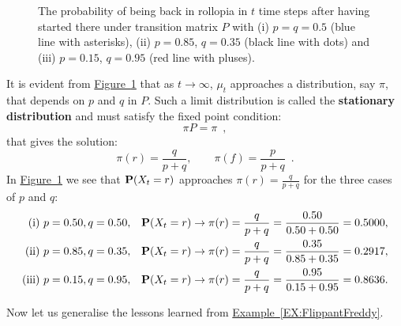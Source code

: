 \begin{example}
\begin{figure}[htpb]
\caption{The probability of being back in rollopia in $t$ time steps after having started there under transition matrix $P$ with (i) $p=q=0.5$ (blue line with asterisks), (ii) $p=0.85$, $q=0.35$ (black line with dots) and (iii) $p=0.15$, $q=0.95$ (red line with pluses).\label{F:FlippantFreddyRollopiaProbs}}
\centering   {}
\end{figure}

It is evident from \hyperref[F:FlippantFreddyRollopiaProbs]{Figure~\ref*{F:FlippantFreddyRollopiaProbs}} that as $t \to \infty$, $\mu_t$ approaches a distribution, say $\pi$, that depends on $p$ and $q$ in $P$.  Such a limit distribution is called the {\bf stationary distribution} and must satisfy the fixed point condition:
\[
\pi P = \pi \enspace ,
\]
that gives the solution:
\[
\pi(r) = \frac{q}{p+q}, \qquad \pi(f) = \frac{p}{p+q} \enspace .
\]
In \hyperref[F:FlippantFreddyRollopiaProbs]{Figure~\ref*{F:FlippantFreddyRollopiaProbs}} we see that $\mathbf{P}(X_t=r)$ approaches $\pi(r) = \frac{q}{p+q}$ for the three cases of $p$ and $q$:
\begin{align*}
\text{(i)}& \ p=0.50, q=0.50, & \mathbf{P}(X_t=r) & \to \pi(r) = \frac{q}{p+q} =  \frac{0.50}{0.50+0.50} = 0.5000,\\
\text{(ii)}& \  p=0.85, q=0.35, & \mathbf{P}(X_t=r) & \to \pi(r) = \frac{q}{p+q} =  \frac{0.35}{0.85+0.35} = 0.2917, \\
\text{(iii)}& \ p=0.15, q=0.95, & \mathbf{P}(X_t=r) & \to \pi(r) = \frac{q}{p+q} = \frac{0.95}{0.15+0.95} = 0.8636.
\end{align*}
\end{example}

Now let us generalise the lessons learned from \hyperref[EX:FlippantFreddy]{Example~\ref*{EX:FlippantFreddy}}.

